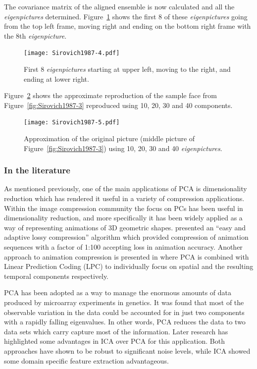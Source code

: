 The covariance matrix of the aligned ensemble is now calculated and all the \emph{eigenpictures} determined. Figure~\ref{fig:Sirovich1987-4} shows the first 8 of these \emph{eigenpictures} going from the top left frame, moving right and ending on the bottom right frame with the 8th \emph{eigenpicture}.

\begin{figure}[!]
  \begin{center}
    \texttt{[image: Sirovich1987-4.pdf]}
    \caption{First 8 \emph{eigenpictures} starting at upper left, moving to the right, and ending at lower right.}\label{fig:Sirovich1987-4}
  \end{center}
\end{figure}

Figure~\ref{fig:Sirovich1987-5} shows the approximate reproduction of the sample face from Figure~\ref{fig:Sirovich1987-3} reproduced using 10, 20, 30 and 40 components.

\begin{figure}[!]
  \begin{center}
    \texttt{[image: Sirovich1987-5.pdf]}
    \caption{Approximation of the original picture (middle picture of Figure~\ref{fig:Sirovich1987-3}) using 10, 20, 30 and 40 \emph{eigenpictures}.}\label{fig:Sirovich1987-5}
  \end{center}
\end{figure}

\subsubsection{In the literature}
As mentioned previously, one of the main applications of PCA is dimensionality reduction which has rendered it useful in a variety of compression applications\citep{Vasilescu2003}\cite{Alexa2000}\cite{Zaeri2006}. Within the image compression community \citep{Vasilescu2003} the focus on PCs has been useful in dimensionality reduction, and more specifically it has been widely applied as a way of representing animations of 3D geometric shapes. \cite{Alexa2000} presented an ``easy and adaptive lossy compression'' algorithm which provided compression of animation sequences with a factor of 1:100 accepting loss in animation accuracy. Another approach to animation compression is presented in \cite{Karni2004} where PCA is combined with Linear Prediction Coding (LPC) to individually focus on spatial and the resulting temporal components respectively.

PCA has been adopted as a way to manage the enormous amounts of data produced by microarray experiments in genetics\cite{Raychaudhuri2000}\cite{Saidi2004}. It was found that most of the observable variation in the data could be accounted for in just two components with a rapidly falling eigenvalues\cite{Raychaudhuri2000}. In other words, PCA reduces the data to two data sets which carry capture most of the information\cite{Raychaudhuri2000}. Later research has highlighted some advantages in ICA over PCA for this application\cite{Saidi2004}. Both approaches have shown to be robust to significant noise levels, while ICA showed some domain specific feature extraction advantageous.


